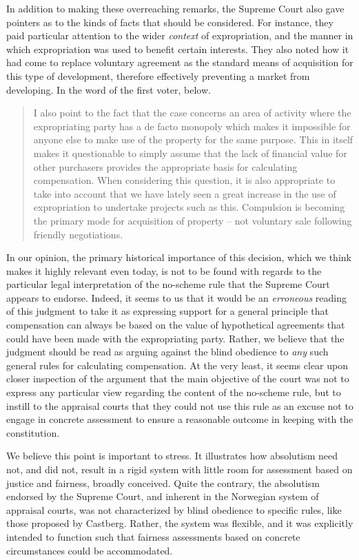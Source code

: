 \documentclass[10pt]{article} %
\begin{document}
In addition to making these overreaching remarks, the Supreme Court also gave pointers as to the kinds of facts that should be considered. For instance, they paid particular attention to the wider \emph{context} of expropriation, and the manner in which expropriation was used to benefit certain interests. They also noted how it had come to replace voluntary agreement as the standard means of acquisition for this type of development, therefore effectively preventing a market from developing. In the word of the first voter, below.

\begin{quote}
I also point to the fact that the case concerns an area of activity where the expropriating party has a de facto monopoly which makes it impossible for anyone else to make use of the property for the same purpose. This in itself makes it questionable to simply assume that the lack of financial value for other purchasers provides the appropriate basis for calculating compensation. When considering this question, it is also appropriate to take into account that we have lately seen a great increase in the use of expropriation to undertake projects such as this. Compulsion is becoming the primary mode for acquisition of property -- not voluntary sale following friendly negotiations.
\end{quote} 

In our opinion, the primary historical importance of this decision, which we think makes it highly relevant even today, is not to be found with regards to the particular legal interpretation of the no-scheme rule that the Supreme Court appears to endorse. Indeed, it seems to us that it would be an \emph{erroneous} reading of this judgment to take it as expressing support for a general principle that compensation can always be based on the value of hypothetical agreements that could have been made with the expropriating party. Rather, we believe that the judgment should be read as arguing against the blind obedience to \emph{any} such general rules for calculating compensation. At the very least, it seems clear upon closer inspection of the argument that the main objective of the court was not to express any particular view regarding the content of the no-scheme rule, but to instill to the appraisal courts that they could not use this rule as an excuse not to engage in concrete assessment to ensure a reasonable outcome in keeping with the constitution.

We believe this point is important to stress. It illustrates how absolutism need not, and did not, result in a rigid system with little room for assessment based on justice and fairness, broadly conceived. Quite the contrary, the absolutism endorsed by the Supreme Court, and inherent in the Norwegian system of appraisal courts, was not characterized by blind obedience to specific rules, like those proposed by Castberg. Rather, the system was flexible, and it was explicitly intended to function such that fairness assessments based on concrete circumstances could be accommodated. 
\end{document}
